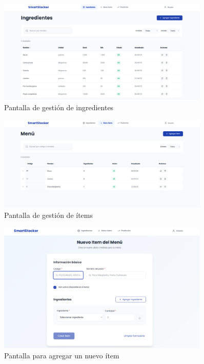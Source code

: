 \begin{figure}[htbp]
    \centering
    \includegraphics[width=0.9\textwidth]{images/ingredientes.png}
    \caption{Pantalla de gestión de ingredientes}
    \label{fig:ux-ingredientes}
\end{figure}

\begin{figure}[htbp]
    \centering
    \includegraphics[width=0.9\textwidth]{images/items.png}
    \caption{Pantalla de gestión de ítems}
    \label{fig:ux-items}
\end{figure}

\begin{figure}[htbp]
    \centering
    \includegraphics[width=0.9\textwidth]{images/nuevoItem.png}
    \caption{Pantalla para agregar un nuevo ítem}
    \label{fig:ux-nuevo-item}
\end{figure}

